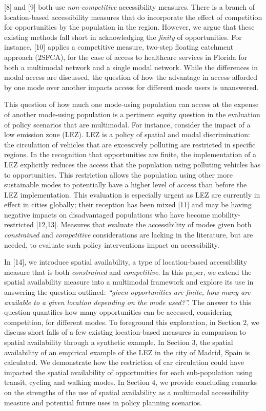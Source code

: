 \documentclass[10pt,letterpaper]{article}
\begin{document}
{[}8{]} and {[}9{]} both use \emph{non-competitive} accessibility
measures. There is a branch of location-based accessibility measures
that do incorporate the effect of competition for opportunities by the
population in the region. However, we argue that these existing methods
fall short in acknowledging the \emph{finity} of opportunities. For
instance, {[}10{]} applies a competitive measure, two-step floating
catchment approach (2SFCA), for the case of access to healthcare
services in Florida for both a multimodal network and a single modal
network. While the differences in modal access are discussed, the
question of how the advantage in access afforded by one mode over
another impacts access for different mode users is unanswered.

This question of how much one mode-using population can access at the
expense of another mode-using population is a pertinent equity question
in the evaluation of policy scenarios that are multimodal. For instance,
consider the impact of a low emission zone (LEZ). LEZ is a policy of
spatial and modal discrimination: the circulation of vehicles that are
excessively polluting are restricted in specific regions. In the
recognition that opportunities are finite, the implementation of a LEZ
explicitly reduces the access that the population using polluting
vehicles has to opportunities. This restriction allows the population
using other more sustainable modes to potentially have a higher level of
access than before the LEZ implementation. This evaluation is especially
urgent as LEZ are currently in effect in cities globally; their
reception has been mixed {[}11{]} and may be having negative impacts on
disadvantaged populations who have become mobility-restricted
{[}12,13{]}. Measures that evaluate the accessibility of modes given
both \emph{constrained} and \emph{competitive} considerations are
lacking in the literature, but are needed, to evaluate such policy
interventions impact on accessibility.

In {[}14{]}, we introduce spatial availability, a type of location-based
accessibility measure that is both \emph{constrained} and
\emph{competitive}. In this paper, we extend the spatial availability
measure into a multimodal framework and explore its use in answering the
question outlined: \emph{``given opportunities are finite, how many are
available to a given location depending on the mode used?''.} The answer
to this question quantifies how many opportunities can be accessed,
considering competition, for different modes. To foreground this
exploration, in Section 2, we discuss short falls of a few existing
location-based measures in comparison to spatial availability through a
synthetic example. In Section 3, the spatial availability of an
empirical example of the LEZ in the city of Madrid, Spain is calculated.
We demonstrate how the restriction of car circulation could have
impacted the spatial availability of opportunities for each
sub-population using transit, cycling and walking modes. In Section 4,
we provide concluding remarks on the strengths of the use of spatial
availability as a multimodal accessibility measure and potential future
uses in policy planning scenarios.
\end{document}
